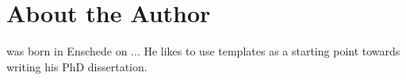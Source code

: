 \chapter*{About the Author}

\myAuthorName was born in Enschede on ...
He likes to use templates as a starting point towards writing his PhD dissertation.

\begin{figure}[h]
    \centering
    \label{fig:headshot}
\end{figure}
